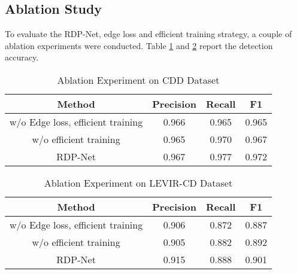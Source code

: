 \documentclass[lettersize,journal]{IEEEtran}
\begin{document}
\subsection{Ablation Study}

To evaluate the RDP-Net, edge loss and efficient training strategy, a couple of ablation experiments were conducted.
Table \ref{Ablation} and \ref{Ablation2} report the detection accuracy.


\begin{table}[ht]
\caption{Ablation Experiment on CDD Dataset}
\label{Ablation}
\centering
\begin{tabular}{cccc}
\hline
\hline
Method & Precision & Recall & F1\\
\hline
w/o Edge loss, efficient training & 0.966 & 0.965 & 0.965\\
w/o efficient training & 0.965 & 0.970 & 0.967\\
RDP-Net & 0.967 & 0.977 & 0.972\\
\hline
\hline
\end{tabular}
\end{table}

\begin{table}[ht]
\caption{Ablation Experiment on LEVIR-CD Dataset}
\label{Ablation2}
\centering
\begin{tabular}{cccc}
\hline
\hline
Method & Precision & Recall & F1\\
\hline
w/o Edge loss, efficient training & 0.906 & 0.872 & 0.887\\
w/o efficient training & 0.905 & 0.882 & 0.892\\
RDP-Net & 0.915 & 0.888 & 0.901\\
\hline
\hline
\end{tabular}
\end{table}
\end{document}
